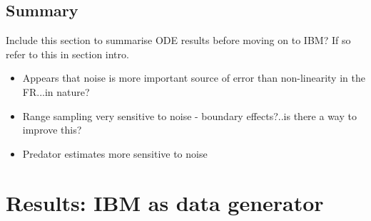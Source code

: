 

\subsection{Summary}
\label{sec:res_ODE_summary}

Include this section to summarise ODE results before moving on to IBM? If so refer to this in section intro.

\begin{itemize}
	\item Appears that noise is more important source of error than non-linearity in the FR...in nature?
	\item Range sampling very sensitive to noise - boundary effects?..is there a way to improve this?
	\item Predator estimates more sensitive to noise
\end{itemize}

%
%
%

\section{Results: IBM as data generator}
\label{sec:ibm}

